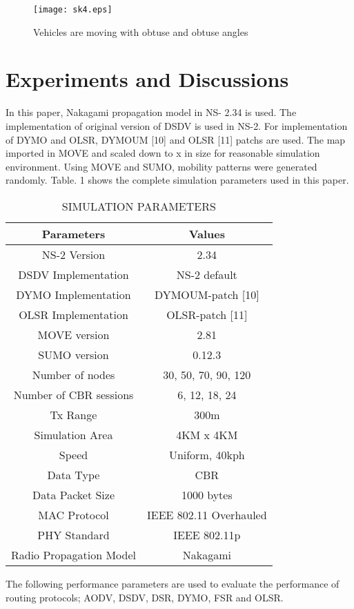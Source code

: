 \documentclass[journal]{IEEEtran}
\begin{document}
\begin{figure}[h]
  \centering
  {\texttt{[image: sk4.eps]}}
  \caption{Vehicles are moving with obtuse and obtuse angles}
\end{figure}


\section{Experiments and Discussions }
In this paper, Nakagami propagation model in NS- 2.34 is used. The implementation of original version of DSDV is used in NS-2. For implementation of DYMO and OLSR, DYMOUM [10] and OLSR [11] patchs  are used. The map imported in MOVE and scaled down to  x  in size for reasonable simulation environment. Using MOVE and SUMO, mobility patterns were generated randomly. Table. 1 shows the complete simulation parameters used in this paper.
\begin{table}[h]
\caption{SIMULATION PARAMETERS}
\begin{center}
 \begin{tabular}{| c | c |}
  \hline
  \textbf{Parameters} & \textbf{Values} \\ \hline
    NS-2 Version &  2.34 \\ \hline
    DSDV Implementation &	NS-2 default \\ \hline
    DYMO Implementation	&   DYMOUM-patch [10] \\ \hline
    OLSR Implementation  &	OLSR-patch [11] \\ \hline
    MOVE version  &	  2.81 \\ \hline
    SUMO version  &	  0.12.3 \\ \hline
    Number of nodes & 30, 50, 70, 90, 120 \\ \hline
    Number of CBR sessions & 6, 12, 18, 24 \\ \hline
    Tx Range &	300m \\ \hline
    Simulation Area &	4KM x 4KM \\ \hline
    Speed &	Uniform, 40kph \\ \hline
    Data Type &	CBR \\ \hline
    Data Packet Size &	1000 bytes \\ \hline
    MAC Protocol &	IEEE 802.11 Overhauled \\ \hline
    PHY Standard &	IEEE 802.11p \\ \hline
    Radio Propagation Model &	Nakagami \\ \hline

 \end{tabular}
\end{center}
\end{table}
The following performance parameters are used to evaluate the performance of routing protocols; AODV, DSDV, DSR, DYMO, FSR and OLSR.
\end{document}
